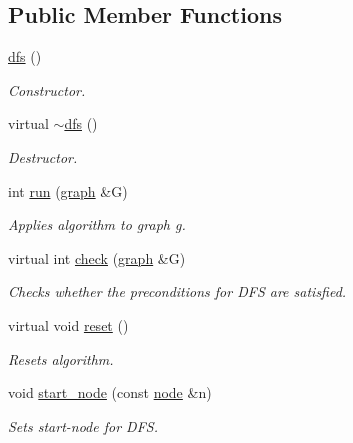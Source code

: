 \subsection*{Public Member Functions}
\begin{DoxyCompactItemize}
\item 
\mbox{\label{classdfs_a5232bc41ab202b6278a84bd97c803a0d}} 
\mbox{\hyperlink{classdfs_a5232bc41ab202b6278a84bd97c803a0d}{dfs}} ()
\begin{DoxyCompactList}\small\item\em Constructor. \end{DoxyCompactList}\item 
\mbox{\label{classdfs_aff2e95c12935221a94551393f7e36c6e}} 
virtual \mbox{\hyperlink{classdfs_aff2e95c12935221a94551393f7e36c6e}{$\sim$dfs}} ()
\begin{DoxyCompactList}\small\item\em Destructor. \end{DoxyCompactList}\item 
int \mbox{\hyperlink{classdfs_af0863b8974d5fd58cd0375c78ed8163b}{run}} (\mbox{\hyperlink{classgraph}{graph}} \&G)
\begin{DoxyCompactList}\small\item\em Applies algorithm to graph g. \end{DoxyCompactList}\item 
virtual int \mbox{\hyperlink{classdfs_a1af70060897529e67910f589b047e576}{check}} (\mbox{\hyperlink{classgraph}{graph}} \&G)
\begin{DoxyCompactList}\small\item\em Checks whether the preconditions for D\+FS are satisfied. \end{DoxyCompactList}\item 
virtual void \mbox{\hyperlink{classdfs_affaffda8be8418d6dbf396c5b1d6b81a}{reset}} ()
\begin{DoxyCompactList}\small\item\em Resets algorithm. \end{DoxyCompactList}\item 
void \mbox{\hyperlink{classdfs_aad21fd0d3036350fd341f877d5747852}{start\+\_\+node}} (const \mbox{\hyperlink{classnode}{node}} \&n)
\begin{DoxyCompactList}\small\item\em Sets start-\/node for D\+FS. \end{DoxyCompactList}\item 

\end{DoxyCompactItemize}
